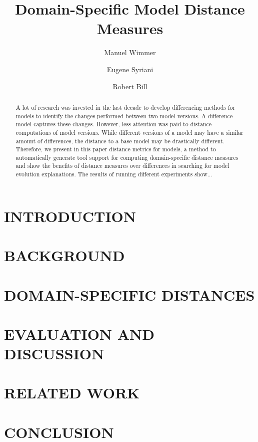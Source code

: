 \documentclass{llncs}
\newcommand\es[1]{\nb{ES}{\textcolor{red}{\textsl{#1}}}}
\begin{document}
    
\title{Domain-Specific Model Distance Measures}

\author{Manuel Wimmer \and Eugene Syriani \and Robert Bill}

\maketitle

\begin{abstract}
A lot of research was invested in the last decade to develop differencing methods for models to identify the changes performed between two model versions.
A difference model captures these changes. However, less attention was paid to distance computations of model versions. While different versions of a model may have a similar amount of differences,
the distance to a base model may be drastically different. Therefore, we present in this paper distance metrics for models, a method to automatically generate tool support for computing domain-specific distance measures and show the benefits of distance measures over differences in searching for model evolution explanations. The results of running different experiments show...\es{todo}
\end{abstract}


\section{INTRODUCTION}


\section{BACKGROUND}


\section{DOMAIN-SPECIFIC DISTANCES}


\section{EVALUATION AND DISCUSSION}


\section{RELATED WORK}


\section{CONCLUSION}




\end{document}
